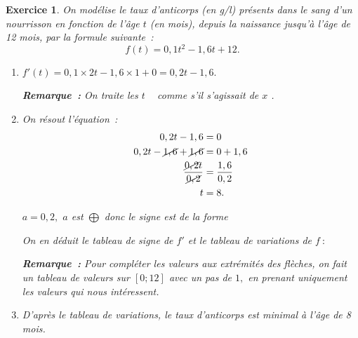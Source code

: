 \documentclass[10pt]{article}
\newtheorem{exo}{Exercice}
\begin{document}
\begin{exo}

On modélise le taux d’anticorps (en g/l) présents dans le sang d’un nourrisson en fonction de l’âge $t$ (en mois), depuis la naissance jusqu’à l’âge de 12 mois, par la formule suivante~:
\[f(t)=0,1 t^2-1,6 t+12.\]

\begin{enumerate}
\item $f'(t)=0,1\times 2t-1,6\times 1+0=0,2t-1,6.$

\medskip

\textbf{Remarque~:} On traite les \og $t$ \fg~{} comme s'il s'agissait de \og $x$ \fg.
\item On résout l'équation~:
\begin{align*}0,2t-1,6&=0\\
 0,2t-\cancel{1,6}+\cancel{1,6}&=0+1,6\\
 \frac{\cancel{0,2}t}{\cancel{0,2}}&=\frac{1,6}{0,2}\\
 t&=8.
 \end{align*}

$a=0,2,$ $a$ est $\bigoplus$ donc le signe est de la forme \fbox{$-~\upphi~+$}

\medskip


On en déduit le tableau de signe de $f'$ et le tableau de variations de $f~:$


\medskip

\begin{center}
\end{center}

\medskip

\textbf{Remarque~:} Pour compléter les valeurs aux extrémités des flèches, on fait un tableau de valeurs sur $\left[0;12\right]$ avec un pas de $1,$ en prenant uniquement les valeurs qui nous intéressent.
\item D'après le tableau de variations, le taux d'anticorps est minimal à l'âge de 8 mois.
\end{enumerate}
\end{exo}
\end{document}
